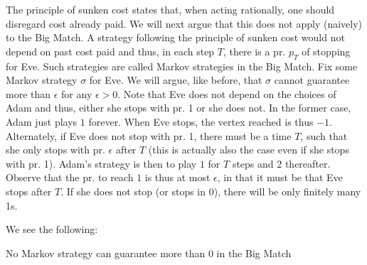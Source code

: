 The principle of sunken cost states that, when acting rationally, one should disregard cost already paid. We will next argue that this does not apply (naively) to the Big Match.
A strategy following the principle of sunken cost would not depend on past cost paid and thus, in each step $T$, there is a pr. $p_T$ of stopping for Eve.
Such strategies are called Markov strategies in the Big Match.
Fix some Markov strategy $\sigma$ for Eve. We will argue, like before, that $\sigma$ cannot guarantee more than $\epsilon$ for any $\epsilon>0$.
Note that Eve does not depend on the choices of Adam and thus, either she stops with pr. 1 or she does not.
In the former case, Adam just plays $1$ forever. When Eve stops, the vertex reached is thus $-1$.
Alternately, if Eve does not stop with pr. 1, there must be a time $T$, such that she only stops with pr. $\epsilon$ after $T$ (this is actually also the case even if she stops with pr. 1). 
Adam's strategy is then to play $1$ for $T$ steps and $2$ thereafter. Observe that the pr. to reach $1$ is thus at most $\epsilon$, in that it must be that Eve stops after $T$. If she does not stop (or stops in $0$), there will be only finitely many 1s.

We see the following:
\begin{lemma}\label{lemm:no_markov_meanpayoff}
No Markov strategy can guarantee more than $0$ in the Big Match
\end{lemma}
